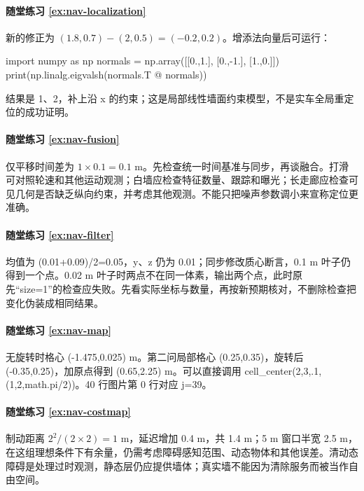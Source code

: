\paragraph*{随堂练习 \ref{ex:nav-localization}}
\begin{solution}
新的修正为 $(1.8,0.7)-(2,0.5)=(-0.2,0.2)$。增添法向量后可运行：
\begin{tpython}
import numpy as np
normals = np.array([[0.,1.], [0.,-1.], [1.,0.]])
print(np.linalg.eigvalsh(normals.T @ normals))
\end{tpython}
结果是 1、2，补上沿 x 的约束；这是局部线性墙面约束模型，不是实车全局重定位的成功证明。
\end{solution}

\paragraph*{随堂练习 \ref{ex:nav-fusion}}
\begin{solution}
仅平移时间差为 $1\times0.1=0.1$ m。先检查统一时间基准与同步，再谈融合。打滑可对照轮速和其他运动观测；白墙应检查特征数量、跟踪和曝光；长走廊应检查可见几何是否缺乏纵向约束，并考虑其他观测。不能只把噪声参数调小来宣称定位更准确。
\end{solution}

\paragraph*{随堂练习 \ref{ex:nav-filter}}
\begin{solution}
均值为 (0.01+0.09)/2=0.05，y、z 仍为 0.01；同步修改质心断言，0.1 m 叶子仍得到一个点。0.02 m 叶子时两点不在同一体素，输出两个点，此时原先“size=1”的检查应失败。先看实际坐标与数量，再按新预期核对，不删除检查把变化伪装成相同结果。
\end{solution}

\paragraph*{随堂练习 \ref{ex:nav-map}}
\begin{solution}
无旋转时格心 (-1.475,0.025) m。第二问局部格心 (0.25,0.35)，旋转后 (-0.35,0.25)，加原点得到 (0.65,2.25) m。可以直接调用 cell\_center(2,3,.1,(1,2,math.pi/2))。40 行图片第 0 行对应 j=39。
\end{solution}

\paragraph*{随堂练习 \ref{ex:nav-costmap}}
\begin{solution}
制动距离 $2^2/(2\times2)=1$ m，延迟增加 0.4 m，共 1.4 m；5 m 窗口半宽 2.5 m，在这组理想条件下有余量，仍需考虑障碍感知范围、动态物体和其他误差。清动态障碍是处理过时观测，静态层仍应提供墙体；真实墙不能因为清除服务而被当作自由空间。
\end{solution}

